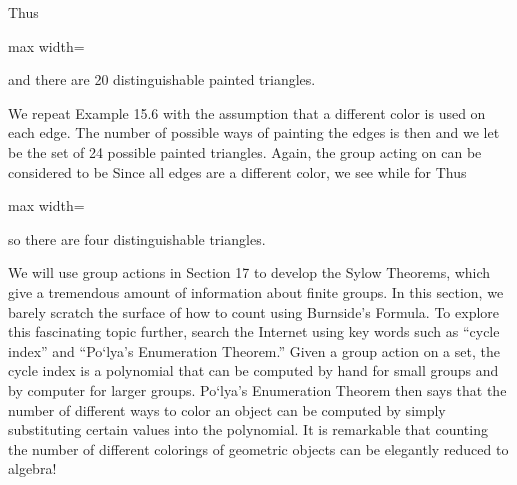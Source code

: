 \documentclass[11pt,oneside]{article}
\begin{document}
\begin{BookBody}
\noindent Thus

\begin{center}\begin{adjustbox}{max width=\linewidth}\end{adjustbox}\end{center}

\noindent and there are 20 distinguishable painted triangles. \BookEnd{\blacktriangle}

 We repeat Example 15.6 with the assumption that a different color is used on each edge. The number of possible ways of painting the edges is then  and we let  be the set of 24 possible painted triangles. Again, the group acting on  can be considered to be  Since all edges are a different color, we see  while  for  Thus

\begin{center}\begin{adjustbox}{max width=\linewidth}\end{adjustbox}\end{center}

\noindent so there are four distinguishable triangles. \BookEnd{\blacktriangle}

We will use group actions in Section 17 to develop the Sylow Theorems, which give a tremendous amount of information about finite groups. In this section, we barely scratch the surface of how to count using Burnside’s Formula. To explore this fascinating topic further, search the Internet using key words such as “cycle index” and “Po`lya’s Enumeration Theorem.” Given a group action on a set, the cycle index is a polynomial that can be computed by hand for small groups and by computer for larger groups. Po`lya’s Enumeration Theorem then says that the number of different ways to color an object can be computed by simply substituting certain values into the polynomial. It is remarkable that counting the number of different colorings of geometric objects can be elegantly reduced to algebra!

\end{BookBody}
\end{document}
